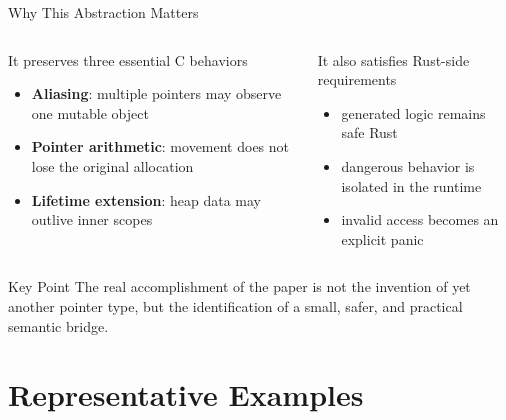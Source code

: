 \documentclass[aspectratio=169,11pt,professionalfonts]{beamer}
\newcommand{\good}[1]{\textcolor{SJTUBlue}{#1}}
\begin{document}
\begin{frame}{Why This Abstraction Matters}
  \small
  \begin{columns}[T]
    \begin{block}{It preserves three essential C behaviors}
      \begin{itemize}
        \item \textbf{Aliasing}: multiple pointers may observe one mutable object
        \item \textbf{Pointer arithmetic}: movement does not lose the original allocation
        \item \textbf{Lifetime extension}: heap data may outlive inner scopes
      \end{itemize}
    \end{block}
    \begin{alertblock}{It also satisfies Rust-side requirements}
      \begin{itemize}
        \item generated logic remains safe Rust
        \item dangerous behavior is isolated in the runtime
        \item invalid access becomes an explicit panic
      \end{itemize}
    \end{alertblock}
  \end{columns}

  \vspace{0.7em}
  \begin{block}{Key Point}
    The real accomplishment of the paper is not the invention of yet another pointer type,
    but the identification of a \good{small, safer, and practical semantic bridge}.
  \end{block}
\end{frame}

\section{Representative Examples}
\end{document}
